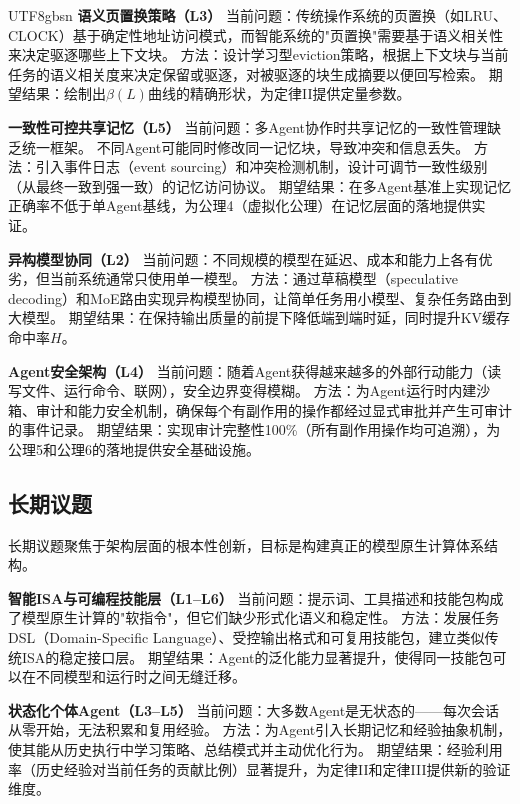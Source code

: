 \documentclass[11pt,a4paper]{article}
\begin{document}
\begin{CJK*}{UTF8}{gbsn}
\textbf{语义页置换策略（L3）}
当前问题：传统操作系统的页置换（如LRU、CLOCK）基于确定性地址访问模式，而智能系统的"页置换"需要基于语义相关性来决定驱逐哪些上下文块。
方法：设计学习型eviction策略，根据上下文块与当前任务的语义相关度来决定保留或驱逐，对被驱逐的块生成摘要以便回写检索。
期望结果：绘制出$\beta(L)$曲线的精确形状，为定律II提供定量参数。

\textbf{一致性可控共享记忆（L5）}
当前问题：多Agent协作时共享记忆的一致性管理缺乏统一框架。
不同Agent可能同时修改同一记忆块，导致冲突和信息丢失。
方法：引入事件日志（event sourcing）和冲突检测机制，设计可调节一致性级别（从最终一致到强一致）的记忆访问协议\cite{raft2014,cap2002}。
期望结果：在多Agent基准上实现记忆正确率不低于单Agent基线，为公理4（虚拟化公理）在记忆层面的落地提供实证。

\textbf{异构模型协同（L2）}
当前问题：不同规模的模型在延迟、成本和能力上各有优劣，但当前系统通常只使用单一模型。
方法：通过草稿模型（speculative decoding\cite{leviathan2023speculative}）和MoE路由\cite{switch2022,mixtral2024}实现异构模型协同，让简单任务用小模型、复杂任务路由到大模型。
期望结果：在保持输出质量的前提下降低端到端时延，同时提升KV缓存命中率$H$。

\textbf{Agent安全架构（L4）}
当前问题：随着Agent获得越来越多的外部行动能力（读写文件、运行命令、联网），安全边界变得模糊。
方法：为Agent运行时内建沙箱、审计和能力安全机制\cite{debenedetti2025camel,ironclaw2025,agenticsecurity2025}，确保每个有副作用的操作都经过显式审批并产生可审计的事件记录。
期望结果：实现审计完整性100\%（所有副作用操作均可追溯），为公理5和公理6的落地提供安全基础设施。

\subsection{长期议题}

长期议题聚焦于架构层面的根本性创新，目标是构建真正的模型原生计算体系结构。

\textbf{智能ISA与可编程技能层（L1--L6）}
当前问题：提示词、工具描述和技能包构成了模型原生计算的"软指令"，但它们缺少形式化语义和稳定性。
方法：发展任务DSL（Domain-Specific Language）、受控输出格式和可复用技能包，建立类似传统ISA的稳定接口层。
期望结果：Agent的泛化能力显著提升，使得同一技能包可以在不同模型和运行时之间无缝迁移。

\textbf{状态化个体Agent（L3--L5）}
当前问题：大多数Agent是无状态的——每次会话从零开始，无法积累和复用经验。
方法：为Agent引入长期记忆和经验抽象机制，使其能从历史执行中学习策略、总结模式并主动优化行为\cite{amem2025,agentmemorysurvey2025}。
期望结果：经验利用率（历史经验对当前任务的贡献比例）显著提升，为定律II和定律III提供新的验证维度。


\end{CJK*}
\end{document}
